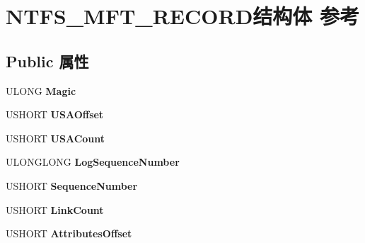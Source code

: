 \hypertarget{struct_n_t_f_s___m_f_t___r_e_c_o_r_d}{}\section{N\+T\+F\+S\+\_\+\+M\+F\+T\+\_\+\+R\+E\+C\+O\+R\+D结构体 参考}
\label{struct_n_t_f_s___m_f_t___r_e_c_o_r_d}
\subsection*{Public 属性}
\begin{DoxyCompactItemize}
\item 
\mbox{\label{struct_n_t_f_s___m_f_t___r_e_c_o_r_d_a20bf7215b5a56dfeccbe277d7cab2feb}} 
U\+L\+O\+NG {\bfseries Magic}
\item 
\mbox{\label{struct_n_t_f_s___m_f_t___r_e_c_o_r_d_a079ea3f93dfd5e1e7108463dfe6e3559}} 
U\+S\+H\+O\+RT {\bfseries U\+S\+A\+Offset}
\item 
\mbox{\label{struct_n_t_f_s___m_f_t___r_e_c_o_r_d_ad151cd43fb5dfb23ece9d92e3b516bd3}} 
U\+S\+H\+O\+RT {\bfseries U\+S\+A\+Count}
\item 
\mbox{\label{struct_n_t_f_s___m_f_t___r_e_c_o_r_d_a3b5b747c5fc274167fd6bcfbf889c106}} 
U\+L\+O\+N\+G\+L\+O\+NG {\bfseries Log\+Sequence\+Number}
\item 
\mbox{\label{struct_n_t_f_s___m_f_t___r_e_c_o_r_d_aaae984631803de9a6d617a34988d52aa}} 
U\+S\+H\+O\+RT {\bfseries Sequence\+Number}
\item 
\mbox{\label{struct_n_t_f_s___m_f_t___r_e_c_o_r_d_a8f806abdc873a6b14cd5d50ddc0ccd60}} 
U\+S\+H\+O\+RT {\bfseries Link\+Count}
\item 
\mbox{\label{struct_n_t_f_s___m_f_t___r_e_c_o_r_d_a98a7b60b42e546e82ab1cfd51b68bcf8}} 
U\+S\+H\+O\+RT {\bfseries Attributes\+Offset}
\item 
\mbox{\label{struct_n_t_f_s___m_f_t___r_e_c_o_r_d_a579ca7daba1b6ccfe39cc17c873bd9d5}} 

\end{DoxyCompactItemize}
